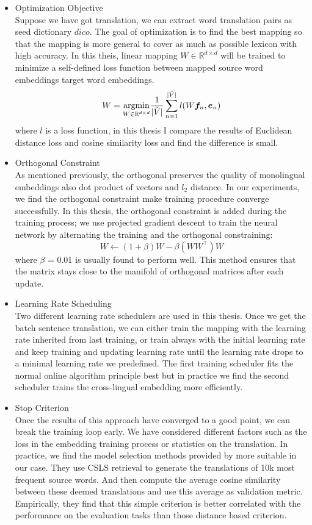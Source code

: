 \begin{itemize}
	
	\item Optimization Objective \\
	Suppose we have got translation, we can extract word translation pairs as seed dictionary $dico$. The goal of optimization is to find the best mapping so that the mapping is more general to cover as much as possible lexicon with high accuracy. In this theis, linear mapping $W \in \mathbb{R}^{d \times d}$ will be trained to minimize a self-defined loss function between mapped  source word embeddings target word embeddings.
	\[ W = \underset{W \in \mathbb{R}^{d \times d}}{\operatorname{argmin}} \frac{1}{{\lvert \tilde{V} \rvert}} \sum_{n=1}^{\lvert \tilde{V} \rvert} l(W\bm{f}_n, \bm{e}_n) \]
	where $l$ is a loss function, in this thesis I compare the results of Euclidean distance loss and cosine similarity loss and find the difference is small.
	\item Orthogonal Constraint\\
	As mentioned previously, the orthogonal preserves the quality of monolingual embeddings also dot product of vectors and  $l_2$ distance. In our experiments, we find the orthogonal constraint make training procedure converge successfully. In this thesis, the orthogonal constraint is added during the training process; we use projected gradient descent to train the neural network by alternating the training and the orthogonal constraining:
\[ W \leftarrow (1+\beta) W - \beta(WW^\top)W\] 
	where $\beta$ = 0.01  is usually found to perform well.  This method ensures that the matrix stays close to the manifold of orthogonal matrices after each update. 	
	\item Learning Rate Scheduling\\
	Two different learning rate schedulers are used in this thesis. Once we get the batch sentence translation, we can either train the mapping with the learning rate inherited from last training, or train always with the initial learning rate and keep training and updating learning rate until the learning rate drops to a minimal learning rate we predefined. The first training scheduler fits the normal online algorithm principle best but in practice we find the second scheduler trains the cross-lingual embedding more efficiently.
	\item Stop Criterion\\
	Once the results of this approach have converged to a good point, we can break the training loop early. We have considered  different factors such as the loss in the embedding training process or statistics on the translation. In practice, we find the model selection methods provided by \cite{conneau2017word} more suitable in our case. They use CSLS retrieval to generate the translations of 10k most frequent source words. And then compute the average cosine similarity between these deemed translations and use this average as validation metric. Empirically, they find that this simple criterion is better correlated with the performance on the evaluation tasks than those distance based criterion.
\end{itemize}
